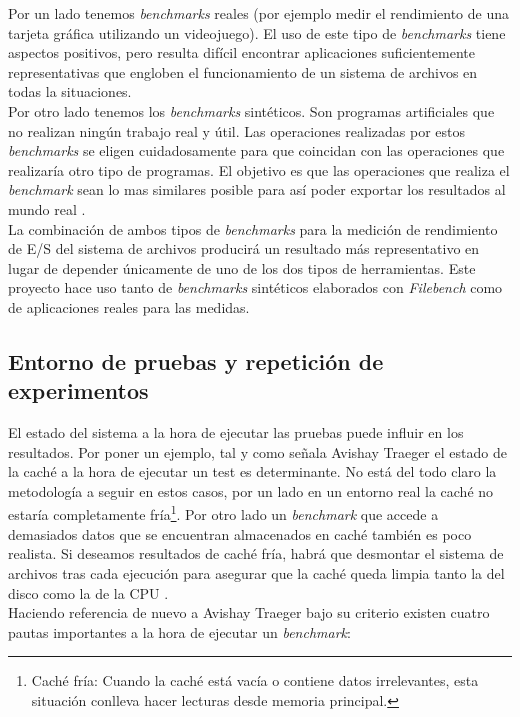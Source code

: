 Por un lado tenemos \textit{benchmarks} reales (por ejemplo medir el rendimiento de una tarjeta gráfica utilizando un videojuego). El uso de este tipo de \textit{benchmarks} tiene aspectos positivos, pero resulta difícil encontrar aplicaciones suficientemente representativas que engloben el funcionamiento de un sistema de archivos en todas la situaciones.\\

Por otro lado tenemos los \textit{benchmarks} sintéticos. Son programas artificiales que no realizan ningún trabajo real y útil. Las operaciones realizadas por estos \textit{benchmarks} se eligen cuidadosamente para que coincidan con las operaciones que realizaría otro tipo de programas. El objetivo es que las operaciones que realiza el \textit{benchmark} sean lo mas similares posible para así poder exportar los resultados al mundo real \cite{lilja_2000}.\\

La combinación de ambos tipos de \textit{benchmarks} para la medición de rendimiento de E/S del sistema de archivos producirá un resultado más representativo en lugar de depender únicamente de uno de los dos tipos de herramientas. Este proyecto hace uso tanto de \textit{benchmarks} sintéticos elaborados con \textit{Filebench} como de aplicaciones reales para las medidas.

\subsection{Entorno de pruebas y repetición de experimentos}\label{numejecs}
El estado del sistema a la hora de ejecutar las pruebas puede influir en los resultados. Por poner un ejemplo, tal y como señala Avishay Traeger \cite{traeger} el estado de la caché a la hora de ejecutar un test es determinante. No está del todo claro la metodología a seguir en estos casos, por un lado en un entorno real la caché no estaría completamente fría\footnote{Caché fría: Cuando la caché está vacía o contiene datos irrelevantes, esta situación conlleva hacer lecturas desde memoria principal.}. Por otro lado un \textit{benchmark} que accede a demasiados datos que se encuentran almacenados en caché también es poco realista. Si deseamos resultados de caché fría, habrá que desmontar el sistema de archivos tras cada ejecución para asegurar que la caché queda limpia tanto la del disco como la de la CPU \cite{traeger}.\\

Haciendo referencia de nuevo a Avishay Traeger bajo su criterio existen cuatro pautas importantes \cite{traeger} a la hora de ejecutar un \textit{benchmark}: 

